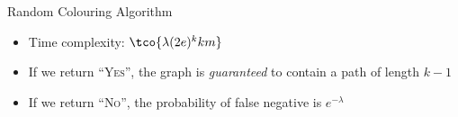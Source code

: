 \begin{theorem}[]{Random Colouring Algorithm}
    \begin{itemize}
        \item Time complexity: $\tco{\lambda(2e)^k km}$
        \item If we return ``\textsc{Yes}'', the graph is \textit{guaranteed} to contain a path of length $k - 1$
        \item If we return ``\textsc{No}'', the probability of false negative is $e^{-\lambda}$
    \end{itemize}
\end{theorem}
